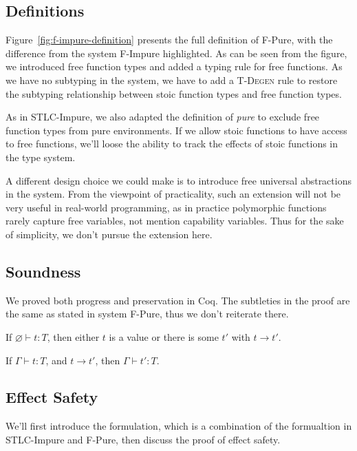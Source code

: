\subsection{Definitions}

Figure~\ref{fig:f-impure-definition} presents the full definition of
F-Pure, with the difference from the system F-Impure highlighted. As
can be seen from the figure, we introduced free function types and
added a typing rule for free functions. As we have no subtyping in the
system, we have to add a \textsc{T-Degen} rule to restore the
subtyping relationship between stoic function types and free function
types.

As in STLC-Impure, we also adapted the definition of \emph{pure} to
exclude free function types from pure environments. If we allow stoic
functions to have access to free functions, we'll loose the ability to
track the effects of stoic functions in the type system.

A different design choice we could make is to introduce free universal
abstractions in the system. From the viewpoint of practicality, such
an extension will not be very useful in real-world programming, as in
practice polymorphic functions rarely capture free variables, not
mention capability variables. Thus for the sake of simplicity, we
don't pursue the extension here.

\subsection{Soundness}

We proved both progress and preservation in Coq. The subtleties in the
proof are the same as stated in system F-Pure, thus we don't reiterate
there.

\begin{theorem}[Progress]
If $\varnothing \vdash t : T$, then either $t$ is a value or there is some
$t'$ with $t \longrightarrow t'$.
\end{theorem}

\begin{theorem}[Preservation]
If $\Gamma \vdash t : T$, and $t \longrightarrow t'$, then $\Gamma
\vdash t' : T$.
\end{theorem}

\subsection{Effect Safety}

We'll first introduce the formulation, which is a combination of the
formualtion in STLC-Impure and F-Pure, then discuss the proof of
effect safety.

